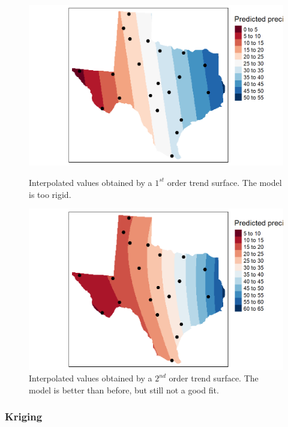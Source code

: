 \begin{figure}[!ht]
    \centering
    \begin{minipage}{0.49\textwidth}
        \centering
        \includegraphics[width=\textwidth]{img/interpolation_fst_order.png}
        \caption{Interpolated values obtained by a $1^{st}$ order trend surface. The model is too rigid.}
        \label{fig:interpolation_fst_order}
    \end{minipage}
    \hfill
    \begin{minipage}{0.49\textwidth}
        \centering
        \includegraphics[width=\textwidth]{img/interpolation_snd_order.png}
        \caption{Interpolated values obtained by a $2^{nd}$ order trend surface. The model is better than before, but still not a good fit.}
        \label{fig:interpolation_snd_order}
    \end{minipage}
\end{figure}

\subsubsection{Kriging}

